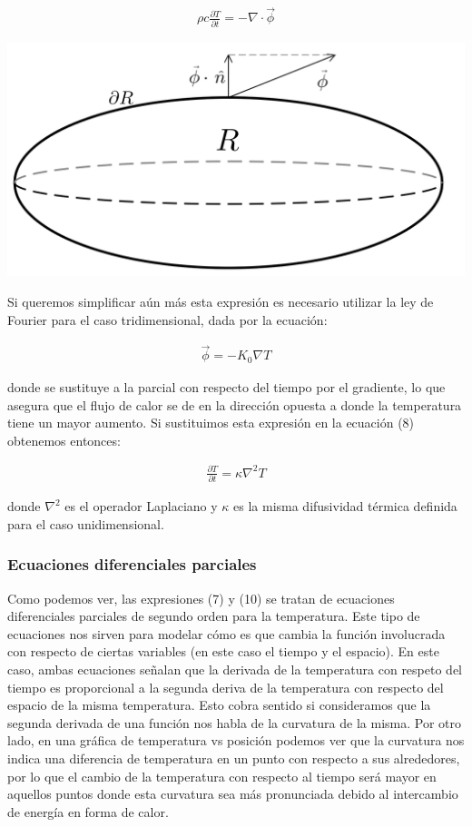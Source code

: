 \documentclass[12pt]{article}
\begin{document}
\begin{align}
    \rho c\frac{\partial T}{\partial t} = - \nabla \cdot\vec{\phi}
\end{align}

\begin{center}
    \includegraphics[width=1\linewidth]{Region_R.png}
\end{center}

Si queremos simplificar aún más esta expresión es necesario utilizar la ley de Fourier para el caso tridimensional, dada por la ecuación:

\begin{align}
    \vec{\phi} = -K_0\nabla T
\end{align}

donde se sustituye a la parcial con respecto del tiempo por el gradiente, lo que asegura que el flujo de calor se de en la dirección opuesta a donde la temperatura tiene un mayor aumento. Si sustituimos esta expresión en la ecuación (8) obtenemos entonces:

\begin{align}
    \frac{\partial T}{\partial t} = \kappa \nabla^2 T
\end{align}

donde $\nabla^2$ es el operador Laplaciano y $\kappa$ es la misma difusividad térmica definida para el caso unidimensional.

\subsubsection{Ecuaciones diferenciales parciales}

Como podemos ver, las expresiones (7) y (10) se tratan de ecuaciones diferenciales parciales de segundo orden para la temperatura. Este tipo de ecuaciones nos sirven para modelar cómo es que cambia la función involucrada con respecto de ciertas variables (en este caso el tiempo y el espacio). En este caso, ambas ecuaciones señalan que la derivada de la temperatura con respeto del tiempo es proporcional a la segunda deriva de la temperatura con respecto del espacio de la misma temperatura. Esto cobra sentido si consideramos que la segunda derivada de una función nos habla de la curvatura de la misma. Por otro lado, en una gráfica de temperatura vs posición podemos ver que la curvatura nos indica una diferencia de temperatura en un punto con respecto a sus alrededores, por lo que el cambio de la temperatura con respecto al tiempo será mayor en aquellos puntos donde esta curvatura sea más pronunciada debido al intercambio de energía en forma de calor. \\
\end{document}
